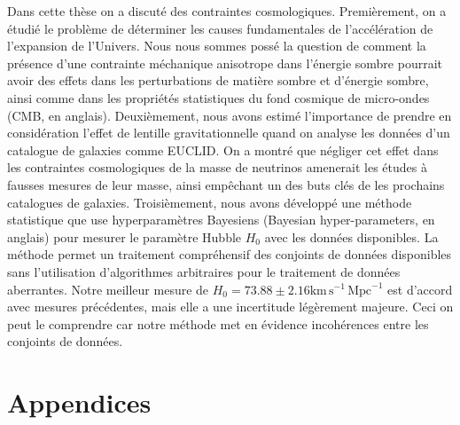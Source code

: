 \documentclass[12pt]{report}
\newcommand{\km}{\mathrm{km}}
\newcommand{\second}{\mathrm{s}}
\newcommand{\Mpc}{\mathrm{Mpc}}
\renewcommand{\(}{\left(}
\renewcommand{\)}{\right)}
\renewcommand{\[}{\left[}
\renewcommand{\]}{\right]}
\begin{document}
Dans cette th\`{e}se on a discut\'{e} des contraintes cosmologiques. Premi\`{e}rement, on a \'{e}tudi\'{e} le probl\`{e}me de d\'{e}terminer les causes fundamentales de l'acc\'{e}l\'{e}ration de l'expansion de l'Univers. Nous nous sommes poss\'{e} la question de comment la pr\'{e}sence d'une contrainte m\'{e}chanique anisotrope dans l'\'{e}nergie sombre pourrait avoir des effets dans les perturbations de mati\`{e}re sombre et d'\'{e}nergie sombre, ainsi comme dans  les propri\'{e}t\'{e}s statistiques du fond cosmique de micro-ondes (CMB, en anglais). Deuxi\`{e}mement, nous avons estim\'{e} l'importance de prendre en consid\'{e}ration l'effet de lentille gravitationnelle quand on analyse les donn\'{e}es d'un catalogue de galaxies comme EUCLID. On a montr\'{e} que n\'{e}gliger cet effet dans les contraintes cosmologiques de la masse de neutrinos amenerait les \'{e}tudes \`{a} fausses mesures de leur masse, ainsi emp\^{e}chant un des buts cl\'{e}s de les prochains catalogues de galaxies. Troisi\`{e}mement, nous avons d\'{e}velopp\'{e} une m\'{e}thode statistique que use hyperparam\`{e}tres Bayesiens (Bayesian hyper-parameters, en anglais) pour mesurer le param\`{e}tre Hubble $H_0$ avec les donn\'{e}es disponibles. La m\'{e}thode permet un traitement compr\'{e}hensif des conjoints de donn\'{e}es disponibles sans l'utilisation d'algorithmes arbitraires pour le traitement de donn\'{e}es aberrantes. Notre meilleur mesure de $H_0 = 73.88 \pm 2.16 \km\, \second^{-1}\, \Mpc^{-1}$ est d'accord avec mesures pr\'{e}c\'{e}dentes, mais elle a une incertitude l\'{e}g\`{e}rement majeure. Ceci on peut le comprendre car notre m\'{e}thode met en \'{e}vidence incoh\'{e}rences entre les conjoints de donn\'{e}es. 

\tableofcontents



\newpage




%











\chapter*{Appendices}  

\appendix





%

%


%


%
\end{document}

